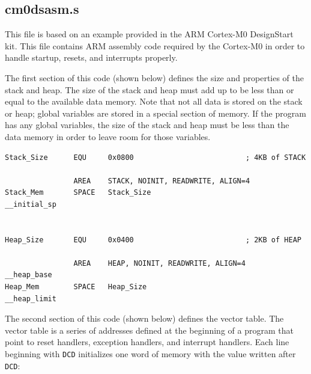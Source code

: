 \subsection{cm0dsasm.s}
This file is based on an example provided in the ARM Cortex-M0 DesignStart kit. This file contains ARM assembly code required by the Cortex-M0 in order to handle startup, resets, and interrupts properly.

The first section of this code (shown below) defines the size and properties of the stack and heap. The size of the stack and heap must add up to be less than or equal to the available data memory. Note that not all data is stored on the stack or heap; global variables are stored in a special section of memory. If the program has any global variables, the size of the stack and heap must be less than the data memory in order to leave room for those variables.

\begin{lstlisting}
Stack_Size      EQU     0x0800                          ; 4KB of STACK

                AREA    STACK, NOINIT, READWRITE, ALIGN=4
Stack_Mem       SPACE   Stack_Size
__initial_sp	


Heap_Size       EQU     0x0400                          ; 2KB of HEAP

                AREA    HEAP, NOINIT, READWRITE, ALIGN=4
__heap_base				
Heap_Mem        SPACE   Heap_Size
__heap_limit
\end{lstlisting}

The second section of this code (shown below) defines the vector table. The vector table is a series of addresses defined at the beginning of a program that point to reset handlers, exception handlers, and interrupt handlers. Each line beginning with \texttt{DCD} initializes one word of memory with the value written after \texttt{DCD}:

